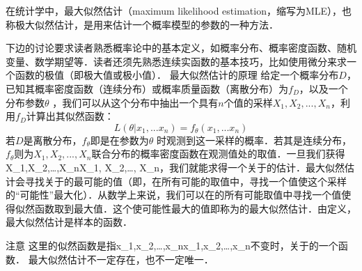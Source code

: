 \begin{issues}
\issueTODO
\end{issues}
在统计学中，最大似然估计（maximum likelihood estimation，缩写为MLE），也称极大似然估计，是用来估计一个概率模型的参数的一种方法．

下边的讨论要求读者熟悉概率论中的基本定义，如概率分布、概率密度函数、随机变量、数学期望等．读者还须先熟悉连续实函数的基本技巧，比如使用微分来求一个函数的极值（即极大值或极小值）．
最大似然估计的原理
给定一个概率分布$D $，已知其概率密度函数（连续分布）或概率质量函数（离散分布）为$f_D $，以及一个分布参数$\theta $ ，我们可以从这个分布中抽出一个具有$n$个值的采样$X_{1},X_{2},... ,X_{n} $，利用$f_D$计算出其似然函数：
$$
L(\theta|x_1,...x_n ) = f_{\theta }(x_1,...x_n )
$$
若$D$是离散分布，$f_{\theta }$即是在参数为$\theta$ 时观测到这一采样的概率．若其是连续分布，$f_{\theta }$则为$X_{1},X_{2},... ,X_{n} $联合分布的概率密度函数在观测值处的取值．一旦我们获得{\displaystyle X_{1},X_{2},\ldots ,X_{n}}X_1, X_2,\ldots, X_n，我们就能求得一个关于{\displaystyle \theta }\theta 的估计．最大似然估计会寻找关于{\displaystyle \theta }\theta 的最可能的值（即，在所有可能的{\displaystyle \theta }\theta 取值中，寻找一个值使这个采样的“可能性”最大化）．从数学上来说，我们可以在{\displaystyle \theta }\theta 的所有可能取值中寻找一个值使得似然函数取到最大值．这个使可能性最大的{\displaystyle {\widehat {\theta }}}\widehat{\theta}值即称为{\displaystyle \theta }\theta 的最大似然估计．由定义，最大似然估计是样本的函数．

注意
这里的似然函数是指{\displaystyle x_{1},x_{2},\ldots ,x_{n}}x_1,x_2,\ldots,x_n不变时，关于{\displaystyle \theta }\theta 的一个函数．
最大似然估计不一定存在，也不一定唯一．
